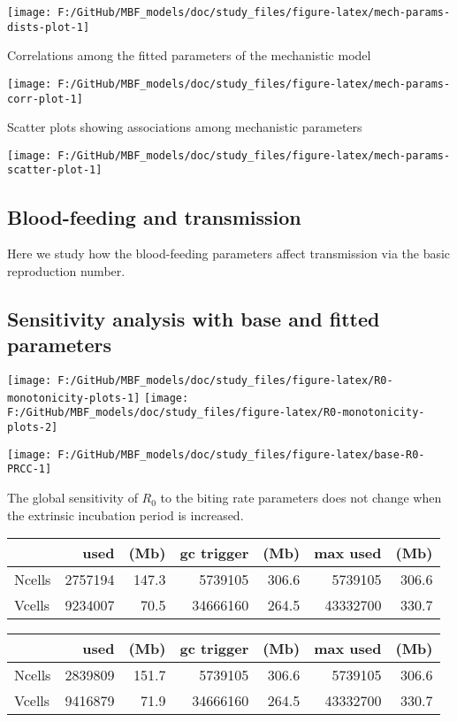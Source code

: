 \documentclass[
]{article}
\begin{document}
\texttt{[image: F:/GitHub/MBF\_models/doc/study\_files/figure-latex/mech-params-dists-plot-1]}

Correlations among the fitted parameters of the mechanistic model

\texttt{[image: F:/GitHub/MBF\_models/doc/study\_files/figure-latex/mech-params-corr-plot-1]}

Scatter plots showing associations among mechanistic parameters

\texttt{[image: F:/GitHub/MBF\_models/doc/study\_files/figure-latex/mech-params-scatter-plot-1]}

\hypertarget{blood-feeding-and-transmission}{%
\subsection{Blood-feeding and
transmission}\label{blood-feeding-and-transmission}}

Here we study how the blood-feeding parameters affect transmission via
the basic reproduction number.

\hypertarget{sensitivity-analysis-with-base-and-fitted-parameters}{%
\subsection{Sensitivity analysis with base and fitted
parameters}\label{sensitivity-analysis-with-base-and-fitted-parameters}}

\texttt{[image: F:/GitHub/MBF\_models/doc/study\_files/figure-latex/R0-monotonicity-plots-1]}
\texttt{[image: F:/GitHub/MBF\_models/doc/study\_files/figure-latex/R0-monotonicity-plots-2]}

\texttt{[image: F:/GitHub/MBF\_models/doc/study\_files/figure-latex/base-R0-PRCC-1]}

The global sensitivity of \(R_0\) to the biting rate parameters does not
change when the extrinsic incubation period is increased.

\begin{longtable}[]{@{}lrrrrrr@{}}
\toprule\noalign{}
& used & (Mb) & gc trigger & (Mb) & max used & (Mb) \\
\midrule\noalign{}
\endhead
\bottomrule\noalign{}
\endlastfoot
Ncells & 2757194 & 147.3 & 5739105 & 306.6 & 5739105 & 306.6 \\
Vcells & 9234007 & 70.5 & 34666160 & 264.5 & 43332700 & 330.7 \\
\end{longtable}

\begin{longtable}[]{@{}lrrrrrr@{}}
\toprule\noalign{}
& used & (Mb) & gc trigger & (Mb) & max used & (Mb) \\
\midrule\noalign{}
\endhead
\bottomrule\noalign{}
\endlastfoot
Ncells & 2839809 & 151.7 & 5739105 & 306.6 & 5739105 & 306.6 \\
Vcells & 9416879 & 71.9 & 34666160 & 264.5 & 43332700 & 330.7 \\
\end{longtable}
\end{document}
